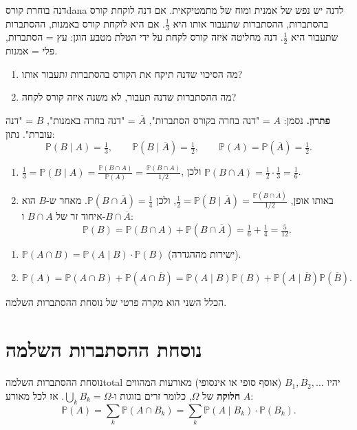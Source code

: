 \documentclass[11pt,a4paper]{report}
\newcommand{\comp}[1]{\overline{#1}}
\newcommand{\PP}{\mathbb{P}}
\begin{document}
\begin{example}{דנה בוחרת קורס}{dana}
לדנה יש נפש של אמנית ומוח של מתמטיקאית. אם דנה לוקחת קורס בהסתברות, ההסתברות שתעבור אותו היא $\frac13$. אם היא לוקחת קורס באמנות, ההסתברות שתעבור היא $\frac12$. דנה מחליטה איזה קורס לקחת על ידי הטלת מטבע הוגן: עץ = הסתברות, פלי = אמנות.
\begin{enumerate}[label=(\alph*)]
  \item מה הסיכוי שדנה תיקח את הקורס בהסתברות \emph{ו}תעבור אותו?
  \item מה ההסתברות שדנה תעבור, לא משנה איזה קורס לקחה?
\end{enumerate}
\textbf{פתרון.} נסמן: $A$ = "דנה בחרה בקורס הסתברות", $\comp A$ = "דנה בחרה באמנות", $B$ = "דנה עוברת". נתון:
\[
  \PP(B\mid A)=\tfrac13,\qquad \PP(B\mid\comp A)=\tfrac12,\qquad \PP(A)=\PP(\comp A)=\tfrac12.
\]
\begin{enumerate}[label=(\alph*)]
  \item $\frac13=\PP(B\mid A)=\frac{\PP(B\cap A)}{\PP(A)}=\frac{\PP(B\cap A)}{1/2}$, ולכן $\PP(B\cap A)=\frac12\cdot\frac13=\frac16$.
  \item באותו אופן, $\frac12=\PP(B\mid\comp A)=\frac{\PP(B\cap\comp A)}{1/2}$, ולכן $\PP(B\cap\comp A)=\frac14$. מאחר ש-$B$ הוא איחוד זר של $B\cap A$ ו-$B\cap\comp A$:
  \[
    \PP(B)=\PP(B\cap A)+\PP(B\cap\comp A)=\tfrac16+\tfrac14=\tfrac5{12}.
  \]
\end{enumerate}
\end{example}

\begin{keybox}[title={שני כללים}]
\begin{enumerate}
  \item $\PP(A\cap B)=\PP(A\mid B)\cdot\PP(B)$ \quad (ישירות מההגדרה).
  \item $\PP(A)=\PP(A\cap B)+\PP(A\cap\comp B)=\PP(A\mid B)\PP(B)+\PP(A\mid\comp B)\PP(\comp B)$.
\end{enumerate}
הכלל השני הוא מקרה פרטי של נוסחת ההסתברות השלמה.
\end{keybox}

\section{נוסחת ההסתברות השלמה}

\begin{theorem}{נוסחת ההסתברות השלמה}{total}
יהיו $B_1,B_2,\dots$ (אוסף סופי או אינסופי) מאורעות המהווים \textbf{חלוקה} של $\Omega$, כלומר זרים בזוגות ו-$\bigcup_k B_k=\Omega$. אז לכל מאורע $A$:
\[
  \PP(A)=\sum_{k}\PP(A\cap B_k)=\sum_k\PP(A\mid B_k)\cdot\PP(B_k).
\]
\end{theorem}
\end{document}

